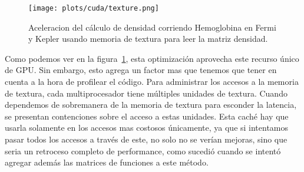 \begin{figure}[htbp]
   \centering
   \texttt{[image: plots/cuda/texture.png]}
   \caption{Aceleracion del c\'alculo de densidad corriendo Hemoglobina en Fermi y Kepler
   usando memoria de textura para leer la matriz densidad.}
   \label{plt:texture}
\end{figure}

Como podemos ver en la figura~\ref{plt:texture}, esta optimizaci\'on aprovecha este
recurso \'unico de GPU. Sin embargo, esto agrega un factor mas que tenemos que tener en
cuenta a la hora de profilear el c\'odigo. Para administrar los accesos a
la memoria de textura, cada multiprocesador tiene m\'ultiples unidades de textura.
Cuando dependemos de sobremanera de la memoria de textura para esconder la latencia,
se presentan contenciones sobre el acceso a estas unidades. Esta cach\'e hay que usarla
solamente en los accesos mas costosos \'unicamente, ya que si intentamos pasar todos
los accesos a trav\'es de este, no solo no se ver\'ian mejoras, sino que seria un retroceso
completo de performance, como sucedi\'o cuando se intent\'o agregar adem\'as las matrices
de funciones a este m\'etodo.


